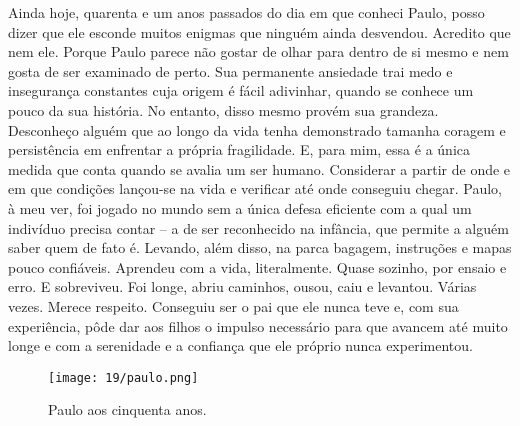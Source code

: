 Ainda hoje, quarenta e um anos passados do dia em que conheci Paulo, posso dizer que ele esconde muitos enigmas que ninguém ainda desvendou.
Acredito que nem ele.
Porque Paulo parece não gostar de olhar para dentro de si mesmo e nem gosta de ser examinado de perto.
Sua permanente ansiedade trai medo e insegurança constantes cuja origem é fácil adivinhar, quando se conhece um pouco da sua história.
No entanto, disso mesmo provém sua grandeza.
Desconheço alguém que ao longo da vida tenha demonstrado tamanha coragem e persistência em enfrentar a própria fragilidade.
E, para mim, essa é a única medida que conta quando se avalia um ser humano.
Considerar a partir de onde e em que condições lançou-se na vida e verificar até onde conseguiu chegar.
Paulo, à meu ver, foi jogado no mundo sem a única defesa eficiente com a qual um indivíduo precisa contar -- a de ser reconhecido na infância, que permite a alguém saber quem de fato é.
Levando, além disso, na parca bagagem, instruções e mapas pouco confiáveis.
Aprendeu com a vida, literalmente.
Quase sozinho, por ensaio e erro.
E sobreviveu.
Foi longe, abriu caminhos, ousou, caiu e levantou.
Várias vezes.
Merece respeito.
Conseguiu ser o pai que ele nunca teve e, com sua experiência, pôde dar aos filhos o impulso necessário para que avancem até muito longe e com a serenidade e a confiança que ele próprio nunca experimentou.


\begin{figure}[H]
\centering
\texttt{[image: 19/paulo.png]}
\caption{Paulo aos cinquenta anos.}
\end{figure}